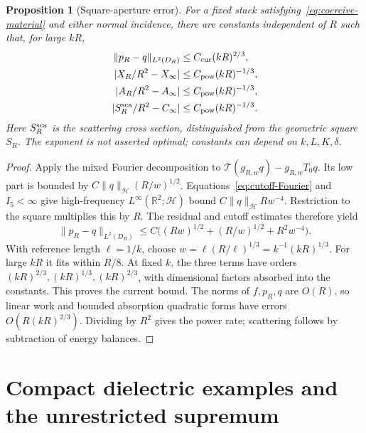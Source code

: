 \documentclass[11pt,a4paper]{article}
\newtheorem{proposition}[theorem]{Proposition}
\theoremstyle{remark}
\newcommand{\norm}[1]{\lVert #1\rVert}
\newcommand{\abs}[1]{\lvert #1\rvert}
\begin{document}
\begin{proposition}[Square-aperture error]\label{prop:rate}
For a fixed stack satisfying~\eqref{eq:coercive-material} and either normal incidence, there are constants independent of $R$ such that, for large $kR$,
\begin{equation}\label{eq:rate}
 \begin{aligned}
 \norm{p_R-q}_{L^2(D_R)}&\leq C_{\rm cur}(kR)^{2/3},\\
 \abs{X_R/R^2-X_\infty}&\leq C_{\rm pow}(kR)^{-1/3},\\
 \abs{A_R/R^2-A_\infty}&\leq C_{\rm pow}(kR)^{-1/3},\\
 \abs{S_R^{\rm sca}/R^2-C_\infty}&\leq C_{\rm pow}(kR)^{-1/3}.
 \end{aligned}
\end{equation}
Here $S_R^{\rm sca}$ is the scattering cross section, distinguished from the geometric square $S_R$. The exponent is not asserted optimal; constants can depend on $k,L,K,\delta$.
\end{proposition}
\begin{proof}
Apply the mixed Fourier decomposition to $\mathcal T(g_{R,w}q)-g_{R,w}T_0q$. Its low part is bounded by $C\norm q_{\mathcal H}(R/w)^{1/2}$. Equations~\eqref{eq:cutoff-Fourier} and $I_5<\infty$ give high-frequency $L^\infty(\mathbb R^2;\mathcal H)$ bound $C\norm q_{\mathcal H}Rw^{-4}$. Restriction to the square multiplies this by $R$. The residual and cutoff estimates therefore yield
\[
 \norm{p_R-q}_{L^2(D_R)}\leq C\bigl((Rw)^{1/2}+(R/w)^{1/2}+R^2w^{-4}\bigr).
\]
With reference length $\ell=1/k$, choose $w=\ell(R/\ell)^{1/3}=k^{-1}(kR)^{1/3}$. For large $kR$ it fits within $R/8$. At fixed $k$, the three terms have orders $(kR)^{2/3},(kR)^{1/3},(kR)^{2/3}$, with dimensional factors absorbed into the constants. This proves the current bound. The norms of $f,p_R,q$ are $O(R)$, so linear work and bounded absorption quadratic forms have errors $O(R(kR)^{2/3})$. Dividing by $R^2$ gives the power rate; scattering follows by subtraction of energy balances.
\end{proof}

\section{Compact dielectric examples and the unrestricted supremum}\label{sec:construction}
\end{document}
